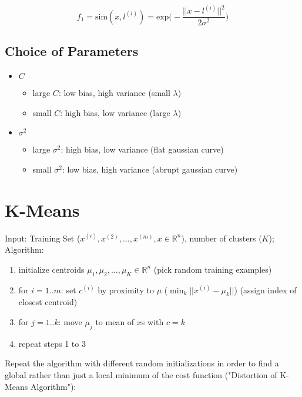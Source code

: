 \documentclass[a4paper,11pt]{scrartcl}
\begin{document}
$$ f_1 = \text{sim}(x,l^{(i)}) = \text{exp}\Bigg( - \frac{|| x - l^{(i)} ||^2}{2\sigma^2} \Bigg) $$

\subsection{Choice of Parameters}

\begin{itemize}
    \item{$C$}
        \begin{itemize}
            \item large $C$: low bias, high variance (small $\lambda$)
            \item small $C$: high bias, low variance (large $\lambda$)
        \end{itemize}
    \item{$\sigma^2$}
        \begin{itemize}
            \item large $\sigma^2$: high bias, low variance (flat gaussian curve)
            \item small $\sigma^2$: low bias, high variance (abrupt gaussian curve)
        \end{itemize}
\end{itemize}

\section{K-Means}

Input: Training Set ($x^{(i)}, x^{(2)}, \dots, x^{(m)}, x \in \mathbb{R}^n$), number of clusters ($K$); Algorithm:

\begin{enumerate}
    \item initialize centroids $\mu_1,\mu_2,\dots,\mu_K \in \mathbb{R}^n$ (pick random training examples)
    \item for $i=1..m$: set $c^{(i)}$ by proximity to $\mu$ ($\displaystyle\min_{k} || x^{(i)} - \mu_{k} ||$) (assign index of closest centroid)
    \item for $j=1..k$: move $\mu_j$ to mean of $x$s with $c=k$
    \item repeat steps 1 to 3
\end{enumerate}

Repeat the algorithm with different random initializations in order to find a global rather than just a local minimum of the cost function ("Distortion of K-Means Algorithm"):
\end{document}
